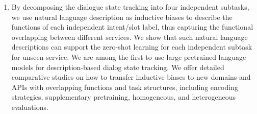\begin{enumerate}
  \item By decomposing the dialogue state tracking into four independent
  subtasks, we use natural language description as inductive biases
  to describe the functions of each independent intent/slot label,
  thus capturing the functional overlapping between different
  services. We show that such natural language descriptions can
  support the zero-shot learning for each independent subtask for
  unseen service. We are among the first to use large pretrained
  language models for description-based dialog state tracking. We
  offer detailed comparative studies on how to transfer inductive
  biases to new domains and APIs with overlapping functions and task
  structures, including encoding strategies, supplementary
  pretraining, homogeneous, and heterogeneous evaluations.
\end{enumerate}


